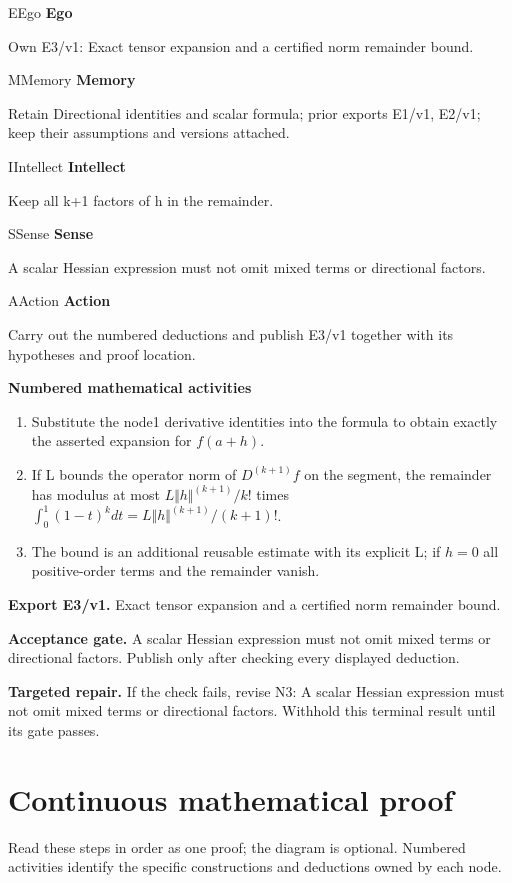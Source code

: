 \documentclass[preprint,12pt,aps,pra,showkeys,amsmath,amssymb,superscriptaddress,floatfix]{revtex4-2}
\theoremstyle{definition}
\theoremstyle{remark}
\newcommand{\mmfaculty}[3]{%
 \begin{mmfacultybox}{#1}{#2}
 {\sffamily\bfseries\color{MMBlue}#2}\par\smallskip #3
 \end{mmfacultybox}}
\newcommand{\field}[2]{\par\smallskip\noindent\textbf{#1.} #2\par}
\begin{document}
\mmfaculty{E}{Ego}{Own E3/v1: Exact tensor expansion and a certified norm remainder bound.}

\mmfaculty{M}{Memory}{Retain Directional identities and scalar formula; prior exports E1/v1,
E2/v1; keep their assumptions and versions attached.}

\mmfaculty{I}{Intellect}{Keep all k+1 factors of h in the remainder.}

\mmfaculty{S}{Sense}{A scalar Hessian expression must not omit mixed terms or directional
factors.}

\mmfaculty{A}{Action}{Carry out the numbered deductions and publish E3/v1 together with its
hypotheses and proof location.}

\smallskip\noindent\textbf{Numbered mathematical activities}

\begin{enumerate}[label=N3.\arabic*,leftmargin=3.4em]

\item Substitute the node1 derivative identities into the formula to obtain
exactly the asserted expansion for \(f(a+h)\).

\item If L bounds the operator norm of \(D^{(k+1)}f\) on the segment, the
remainder has modulus at most \(L\Vert h\Vert ^{(k+1)}/k!\) times
\(\int _{0}^{1}(1-t)^kdt=L\Vert h\Vert ^{(k+1)}/(k+1)!\).

\item The bound is an additional reusable estimate with its explicit L; if
\(h=0\) all positive-order terms and the remainder vanish.

\end{enumerate}

\field{Export E3/v1}{Exact tensor expansion and a certified norm remainder bound.}

\field{Acceptance gate}{A scalar Hessian expression must not omit mixed terms or directional
factors. Publish only after checking every displayed deduction.}

\field{Targeted repair}{If the check fails, revise N3: A scalar Hessian expression must not omit
mixed terms or directional factors. Withhold this terminal result until
its gate passes.}

\endgroup\clearpage\section{Continuous mathematical proof}\label{sec:proof}

Read these steps in order as one proof; the diagram is optional.
Numbered activities identify the specific constructions and deductions
owned by each node.
\end{document}
